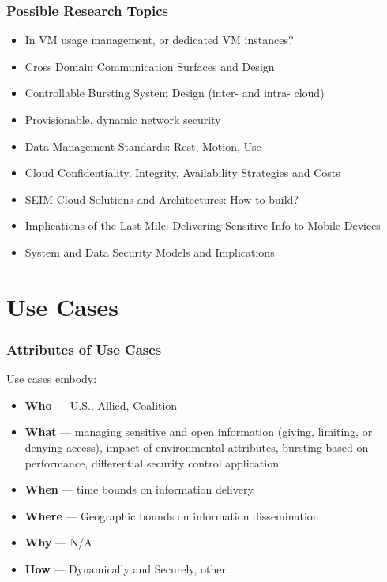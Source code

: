 \documentclass[t,handout]{beamer}
\begin{document}
\begin{frame}
\frametitle{Possible Research Topics}
\begin{itemize}
\item In VM usage management, or dedicated VM instances?
\item Cross Domain Communication Surfaces and Design
\item Controllable Bursting System Design  (inter- and intra- cloud)
\item Provisionable, dynamic network security
\item Data Management Standards: Rest, Motion, Use
\item Cloud Confidentiality, Integrity, Availability Strategies and Costs
\item SEIM Cloud Solutions and Architectures: How to build?
\item Implications of the Last Mile: Delivering Sensitive Info to Mobile Devices
\item System and Data Security Models and Implications
\end{itemize}
\end{frame}

\section{Use Cases}

\begin{frame}
\frametitle{Attributes of Use Cases}
Use cases embody:
\begin{itemize}
\item {\bf Who} --- U.S., Allied, Coalition
\item {\bf What} --- managing sensitive and open information (giving, limiting, or denying access), impact of environmental attributes, bursting based on performance, differential security control application
\item {\bf When} --- time bounds on information delivery
\item {\bf Where} --- Geographic bounds on information dissemination
\item {\bf Why} --- N/A
\item {\bf How} --- Dynamically and Securely, other
\end{itemize}
\end{frame}
\end{document}
